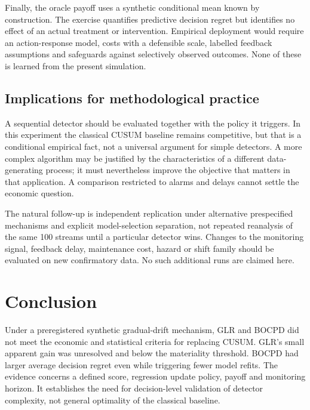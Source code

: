 \documentclass[11pt,a4paper]{article}
\begin{document}
Finally, the oracle payoff uses a synthetic conditional mean known by construction. The exercise quantifies predictive decision regret but identifies no effect of an actual treatment or intervention. Empirical deployment would require an action-response model, costs with a defensible scale, labelled feedback assumptions and safeguards against selectively observed outcomes. None of these is learned from the present simulation.

\subsection{Implications for methodological practice}
A sequential detector should be evaluated together with the policy it triggers. In this experiment the classical CUSUM baseline remains competitive, but that is a conditional empirical fact, not a universal argument for simple detectors. A more complex algorithm may be justified by the characteristics of a different data-generating process; it must nevertheless improve the objective that matters in that application. A comparison restricted to alarms and delays cannot settle the economic question.

The natural follow-up is independent replication under alternative prespecified mechanisms and explicit model-selection separation, not repeated reanalysis of the same 100 streams until a particular detector wins. Changes to the monitoring signal, feedback delay, maintenance cost, hazard or shift family should be evaluated on new confirmatory data. No such additional runs are claimed here.

\section{Conclusion}\label{sec:conclusion}
Under a preregistered synthetic gradual-drift mechanism, GLR and BOCPD did not meet the economic and statistical criteria for replacing CUSUM. GLR's small apparent gain was unresolved and below the materiality threshold. BOCPD had larger average decision regret even while triggering fewer model refits. The evidence concerns a defined score, regression update policy, payoff and monitoring horizon. It establishes the need for decision-level validation of detector complexity, not general optimality of the classical baseline.
\end{document}
